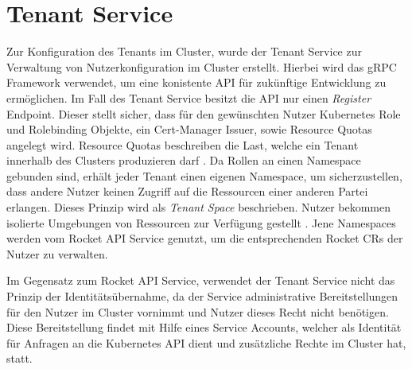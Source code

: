 \section{Tenant Service}
\label{sec:komponenten:tenant-service}
Zur Konfiguration des Tenants im Cluster, wurde der Tenant Service zur Verwaltung von Nutzerkonfiguration im Cluster erstellt.
Hierbei wird das gRPC Framework verwendet, um eine konistente API für zukünftige Entwicklung zu ermöglichen.
Im Fall des Tenant Service besitzt die API nur einen \emph{Register} Endpoint.
Dieser stellt sicher, dass für den gewünschten Nutzer 
Kubernetes Role und Rolebinding Objekte, ein Cert-Manager Issuer, sowie Resource Quotas angelegt wird. 
Resource Quotas beschreiben die Last, welche ein Tenant innerhalb des Clusters produzieren darf \cite{Krebs2012}.
Da Rollen an einen Namespace gebunden sind, erhält jeder Tenant einen eigenen Namespace, um sicherzustellen,
dass andere Nutzer keinen Zugriff auf die Ressourcen einer anderen Partei erlangen.
Dieses Prinzip wird als \emph{Tenant Space} beschrieben. 
Nutzer bekommen isolierte Umgebungen von Ressourcen zur Verfügung gestellt \cite{Krebs2012}.
Jene Namespaces werden vom Rocket API Service genutzt, um die entsprechenden Rocket \acp{CR} der Nutzer zu verwalten. 

Im Gegensatz zum Rocket API Service, verwendet der Tenant Service nicht das Prinzip der Identitätsübernahme, da
der Service administrative Bereitstellungen für den Nutzer im Cluster vornimmt und Nutzer dieses Recht nicht benötigen. 
Diese Bereitstellung findet mit Hilfe eines Service Accounts, welcher als Identität für Anfragen 
an die Kubernetes API dient und zusätzliche Rechte im Cluster hat, statt. 